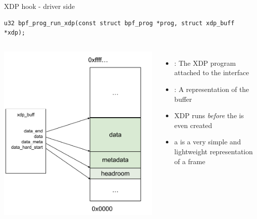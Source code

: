 \begin{frame}[fragile]{XDP hook - driver side}
	\begin{verbatim}
u32 bpf_prog_run_xdp(const struct bpf_prog *prog, struct xdp_buff *xdp);
	\end{verbatim}
		\vspace{0.6cm}
	\begin{columns}
		\includegraphics[width=1.3\textwidth]{slides/networking-ebpf-xdp/xdp_buff.pdf}
	\begin{itemize}
		\item {} : The XDP program attached to the interface
		\item {} : A representation of the buffer
		\item XDP runs \textit{before} the  is even created
		\item a  is a very simple and lightweight representation of a frame
	\end{itemize}
	\end{columns}
\end{frame}

